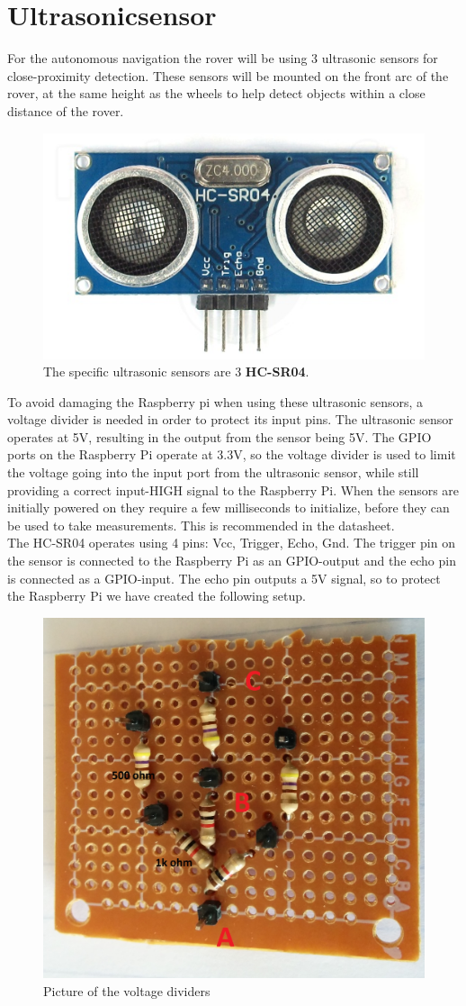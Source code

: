 \clearpage
\section{Ultrasonicsensor}

For the autonomous navigation the rover will be using 3 ultrasonic sensors for close-proximity detection. These sensors will be mounted on the front arc of the rover, at the same height as the wheels to help detect objects within a close distance of the rover.
\begin{figure}[H]
	\centering
	\includegraphics[width=.3\linewidth]{images/hcsr40.jpg}
	\caption{The specific ultrasonic sensors are 3 \textbf{HC-SR04}.}
	\label{ultrasonic_pic}
\end{figure}
To avoid damaging the Raspberry pi when using these ultrasonic sensors, a voltage divider is needed in order to protect its input pins. The ultrasonic sensor operates at 5V, resulting in the output from the sensor being 5V. The GPIO ports on the Raspberry Pi operate at 3.3V, so the voltage divider is used to limit the voltage going into the input port from the ultrasonic sensor, while still providing a correct input-HIGH signal to the Raspberry Pi.
When the sensors are initially powered on they require a few milliseconds to initialize, before they can be used to take measurements. This is recommended in the datasheet.\cite{hcsr40datesheet}\\
The HC-SR04 operates using 4 pins: Vcc, Trigger, Echo, Gnd.
The trigger pin on the sensor is connected to the Raspberry Pi as an GPIO-output and the echo pin is connected as a GPIO-input. The echo pin outputs a 5V signal, so to protect the Raspberry Pi we have created the following setup.
\begin{figure}[H]
	\centering
	\includegraphics[width=.3\linewidth]{images/vd_labelled.jpg}
	\caption{Picture of the voltage dividers}
	\label{voltagedividers}
\end{figure}
